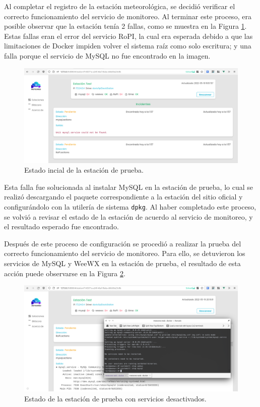 Al completar el registro de la estación meteorológica, se decidió verificar el correcto funcionamiento del servicio de monitoreo. Al terminar este proceso, era posible observar que la estación tenía 2 fallas, como se muestra en la Figura \ref{fig:test-station-initial}. Estas fallas eran el error del servicio RoPI, la cual era esperada debido a que las limitaciones de Docker impiden volver el sistema raíz como solo escritura; y una falla porque el servicio de MySQL no fue encontrado en la imagen.

\begin{figure}[!ht]
	\centering
	\includegraphics[width=1\linewidth]{images/screenshots/0.1.2-test_station_initial_status.png}
	\caption{Estado incial de la estación de prueba.}
	\label{fig:test-station-initial}
\end{figure}

Esta falla fue solucionada al instalar MySQL en la estación de prueba, lo cual se realizó descargando el paquete correspondiente a la estación del sitio oficial y configurándolo con la utilería de sistema \texttt{dpkg}. Al haber completado este proceso, se volvió a revisar el estado de la estación de acuerdo al servicio de monitoreo, y el resultado esperado fue encontrado.

Después de este proceso de configuración se procedió a realizar la prueba del correcto funcionamiento del servicio de monitoreo. Para ello, se detuvieron los servicios de MySQL y WeeWX en la estación de prueba, el resultado de esta acción puede observarse en la Figura \ref{fig:test-station-failed}.

\begin{figure}[!ht]
	\centering
	\includegraphics[width=1\linewidth]{images/screenshots/0.1.4-test_station_failed.png}
	\caption{Estado de la estación de prueba con servicios desactivados.}
	\label{fig:test-station-failed}
\end{figure}

